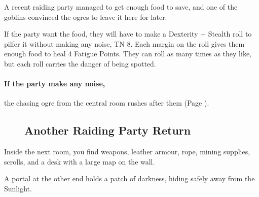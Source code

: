 \begin{multicols}{2}
\begin{boxtext}
\end{boxtext}


A recent raiding party managed to get enough food to save, and one of the goblins convinced the ogres to leave it here for later.

If the party want the food, they will have to make a Dexterity + Stealth roll to pilfer it without making any noise, TN 8.
Each margin on the roll gives them enough food to heal 4 Fatigue Points.
They can roll as many times as they like, but each roll carries the danger of being spotted.

\paragraph{If the party make any noise,}
the chasing ogre from the central room rushes after them (Page \pageref{chasingogre}).

\begin{figure*}[b!]

\setcounter{enc}{\value{list}}
\subsection{Another Raiding Party Return}
\setcounter{list}{\value{enc}}


\end{figure*}

\begin{boxtext}

  Inside the next room, you find weapons, leather armour, rope, mining supplies, scrolls, and a desk with a large map on the wall.

  A portal at the other end holds a patch of darkness, hiding safely away from the Sunlight.


\end{boxtext}
\end{multicols}
